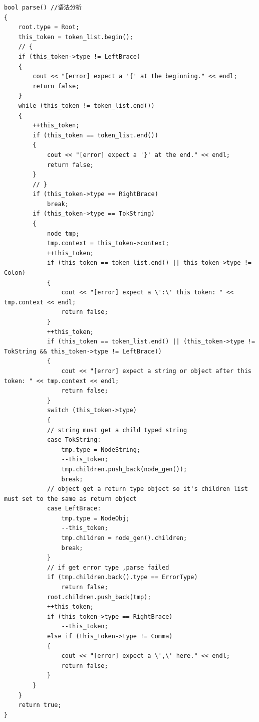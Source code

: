 \documentclass[a4paper,11pt,UTF8]{ctexart}
\begin{document}
\begin{lstlisting}[caption=lexer.cpp,captionpos=b]
bool parse() //语法分析
{
    root.type = Root;
    this_token = token_list.begin();
    // {
    if (this_token->type != LeftBrace)
    {
        cout << "[error] expect a '{' at the beginning." << endl;
        return false;
    }
    while (this_token != token_list.end())
    {
        ++this_token;
        if (this_token == token_list.end())
        {
            cout << "[error] expect a '}' at the end." << endl;
            return false;
        }
        // }
        if (this_token->type == RightBrace)
            break;
        if (this_token->type == TokString)
        {
            node tmp;
            tmp.context = this_token->context;
            ++this_token;
            if (this_token == token_list.end() || this_token->type != Colon)
            {
                cout << "[error] expect a \':\' this token: " << tmp.context << endl;
                return false;
            }
            ++this_token;
            if (this_token == token_list.end() || (this_token->type != TokString && this_token->type != LeftBrace))
            {
                cout << "[error] expect a string or object after this token: " << tmp.context << endl;
                return false;
            }
            switch (this_token->type)
            {
            // string must get a child typed string
            case TokString:
                tmp.type = NodeString;
                --this_token;
                tmp.children.push_back(node_gen());
                break;
            // object get a return type object so it's children list must set to the same as return object
            case LeftBrace:
                tmp.type = NodeObj;
                --this_token;
                tmp.children = node_gen().children;
                break;
            }
            // if get error type ,parse failed
            if (tmp.children.back().type == ErrorType)
                return false;
            root.children.push_back(tmp);
            ++this_token;
            if (this_token->type == RightBrace)
                --this_token;
            else if (this_token->type != Comma)
            {
                cout << "[error] expect a \',\' here." << endl;
                return false;
            }
        }
    }
    return true;
}


\end{lstlisting}
\end{document}

